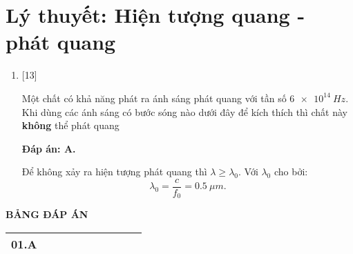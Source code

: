 \whiteBGstarBegin
\setcounter{section}{0}
\section{Lý thuyết: Hiện tượng quang - phát quang}
\begin{enumerate}[label=\bfseries Câu \arabic*:]

		\item {} 
	
		\cauhoi
		{Một chất có khả năng phát ra ánh sáng phát quang với tần số $ \SI{6e14}{Hz} $. Khi dùng các ánh sáng có bước sóng nào dưới đây để kích thích thì chất này \textbf{không} thể phát quang
		}
	
		\loigiai
		{		\textbf{Đáp án: A.}
		
Để không xảy ra hiện tượng phát quang thì $ \lambda \geq \lambda_{0} $. Với $ \lambda_{0} $ cho bởi:
$$
	\lambda_{0} = \dfrac{c}{f_{0}} = \SI{0,5}{\mu m}.
$$	
		}
		
	
\end{enumerate}

\loigiai
{
	\begin{center}
		\textbf{BẢNG ĐÁP ÁN}
	\end{center}
	\begin{center}
		\begin{tabular}{|m{2.8em}|m{2.8em}|m{2.8em}|m{2.8em}|m{2.8em}|m{2.8em}|m{2.8em}|m{2.8em}|m{2.8em}|m{2.8em}|}
			\hline
			01.A  & &  &  &  &  & & &  &  \\
			\hline
			
		\end{tabular}
	\end{center}
}

